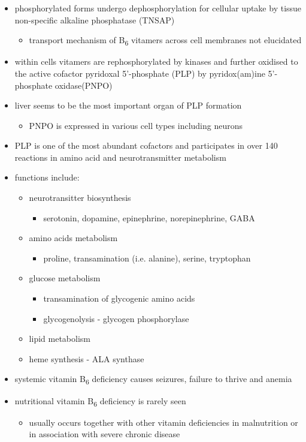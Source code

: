 \documentclass{scrartcl}
\begin{document}
\begin{itemize}
\item phosphorylated forms undergo dephosphorylation for cellular uptake
by tissue non-specific alkaline phosphatase (TNSAP)
\begin{itemize}
\item transport mechanism of B\textsubscript{6} vitamers across cell membranes not
elucidated
\end{itemize}
\item within cells vitamers are rephosphorylated by kinases and further oxidised to the
active cofactor pyridoxal 5’-phosphate (PLP) by pyridox(am)ine
5’-phosphate oxidase(PNPO)
\item liver seems to be the most important organ of PLP formation
\begin{itemize}
\item PNPO is expressed in various cell types including neurons
\end{itemize}
\item PLP is one of the most abundant cofactors and participates in over
140 reactions in amino acid and neurotransmitter metabolism
\item functions include:
\begin{itemize}
\item neurotransitter biosynthesis
\begin{itemize}
\item serotonin, dopamine, epinephrine, norepinephrine, GABA
\end{itemize}
\item amino acids metabolism
\begin{itemize}
\item proline, transamination (i.e. alanine), serine, tryptophan
\end{itemize}
\item glucose metabolism
\begin{itemize}
\item transamination of glycogenic amino acids
\item glycogenolysis - glycogen phosphorylase
\end{itemize}
\item lipid metabolism
\item heme synthesis - ALA synthase
\end{itemize}
\item systemic vitamin B\textsubscript{6} deficiency causes seizures, failure to thrive
and anemia
\item nutritional vitamin B\textsubscript{6} deficiency is rarely seen
\begin{itemize}
\item usually occurs together with other vitamin deficiencies in
malnutrition or in association with severe chronic disease
\end{itemize}
\end{itemize}
\end{document}
